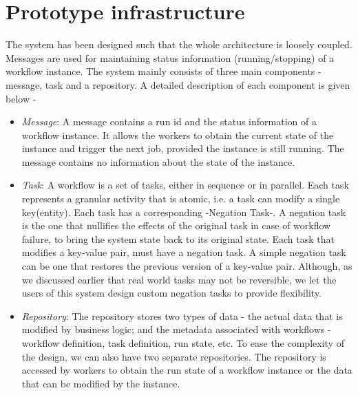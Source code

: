 \section{Prototype infrastructure}\label{sec:background}

The system has been designed such that the whole architecture is loosely
coupled. Messages are used for maintaining status information
(running/stopping) of a workflow instance. The system mainly consists of three
main components - message, task and a repository. A
detailed description of each component is given below -

\begin{itemize}
  \item{\emph{Message}: A message contains a run id and the
  status information of a workflow instance. It allows the workers to obtain the current state of
  the instance and trigger the next job, provided the instance is
  still running. The message contains no information about the state of the
  instance.}
  \item{\emph{Task}: A workflow is a set of tasks, either in sequence or in
  parallel. Each task represents a granular activity that is atomic, i.e. a
  task can modify a single key(entity). Each task has a corresponding -Negation
  Task-. A negation task is the one that nullifies the effects of the original
  task in case of workflow failure, to bring the system state back to
  its original state. Each task that modifies a key-value pair, must have a
  negation task. A simple negation task can be one that restores the previous
  version of a key-value pair. Although, as we discussed
  earlier that real world tasks may not be reversible, we let the users of this
  system design custom negation tasks to provide flexibility.}
  \item{\emph{Repository}: The repository stores two types of data - the actual
  data that is modified by business logic; and the metadata associated with
  workflows - workflow definition, task definition, run state, etc. To ease the
  complexity of the design, we can also have two separate repositories. The
  repository is accessed by workers to obtain the run state of a workflow
  instance or the data that can be modified by the instance.}  
\end{itemize}